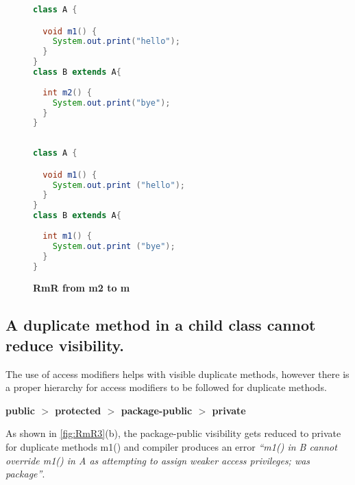 \begin{figure}[th]
\centering
\begin{minipage}[t]{0.7\linewidth}
\begin{lstlisting}[language=java, basicstyle=\scriptsize\ttfamily,frame=single]
class A {

  void m1() {
    System.out.print("hello");
  }
}
class B extends A{
 
  int m2() {
    System.out.print("bye");
  }	
}
 
\end{lstlisting}
\end{minipage}
\hfill
\begin{minipage}[t]{0.7\linewidth}
\begin{lstlisting}[language=java, basicstyle=\scriptsize\ttfamily,frame=single]
class A {

  void m1() {
    System.out.print ("hello");
  }
}
class B extends A{
 
  int m1() {
    System.out.print ("bye");
  }	
}

\end{lstlisting}
\end{minipage}
\caption{\textbf{RmR from m2 to m}}
\label{fig:RmR2}
\end{figure}

\subsection{A duplicate method in a child class cannot reduce visibility.}

The use of access modifiers helps with visible duplicate methods, however there is a proper hierarchy for access modifiers to be followed for duplicate methods.


\begin{center}
\textbf{public $>$ protected $>$ package-public $>$ private}
\end{center}


As shown in \ref{fig:RmR3}(b), the package-public visibility gets reduced to private for duplicate methods m1() and compiler produces an error \textsl{``m1() in B cannot override m1() in A as attempting to assign weaker access privileges; was package''}. 

